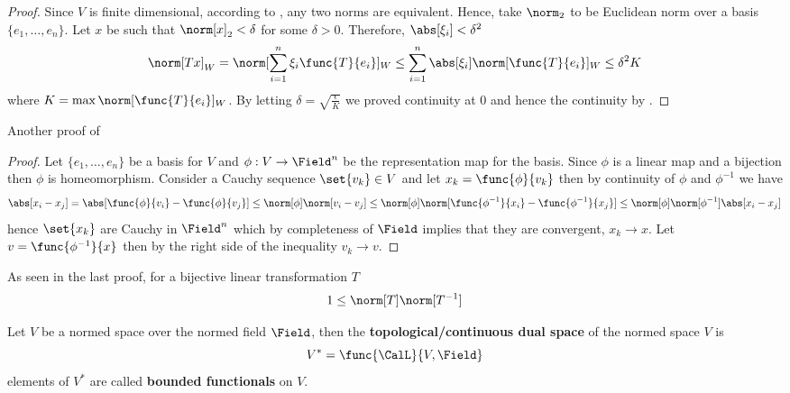 \begin{proof}
    Since \(V\) is finite dimensional, according to , any two norms are equivalent. Hence, take \(\norm_2\) to be Euclidean norm over a basis \(\{e_1, \dots , e_n\}\). Let \(x\) be such that \(\norm[x]_2 < \delta\) for some \(\delta > 0\). Therefore, \(\abs[\xi_i] < \delta^2\)
    \begin{equation*}
        \norm[Tx]_W = \norm[\sum_{i = 1}^n \xi_i \func{T}{e_i}]_W \leq \sum_{i = 1}^n \abs[\xi_i] \norm[\func{T}{e_i}]_W \leq \delta^2 K
    \end{equation*}
    where \(K = \max \norm[\func{T}{e_i}]_W \). By letting \(\delta = \sqrt{\frac{\epsilon}{K}}\) we proved continuity at \(0\) and hence the continuity by .
\end{proof}

Another proof of 

\begin{proof}
    Let \(\{e_1, \dots , e_n\}\) be a basis for \(V\) and \(\phi : V \to \Field^n\) be the representation map for the basis. Since \(\phi\) is a linear map and a bijection then \(\phi\) is homeomorphism. Consider a Cauchy sequence \(\set{v_k} \in V\) and let \(x_k = \func{\phi}{v_k}\) then by continuity of \(\phi\) and \(\phi^{-1}\) we have
    \begin{equation*}
        \abs[x_i - x_j] = \abs[\func{\phi}{v_i} - \func{\phi}{v_j}] \leq \norm[\phi] \norm[v_i - v_j] \leq \norm[\phi] \norm[\func{\phi^{-1}}{x_i} - \func{\phi^{-1}}{x_j}] \leq \norm[\phi] \norm[\phi^{-1}] \abs[x_i - x_j]
    \end{equation*}
    hence \(\set{x_k}\) are Cauchy in \(\Field^n\) which by completeness of \(\Field\) implies that they are convergent, \(x_k \to x\). Let \(v = \func{\phi^{-1}}{x}\) then by the right side of the inequality \(v_k \to v\).
\end{proof}

\begin{remark}
    As seen in the last proof, for a bijective linear transformation \(T\)
    \begin{equation*}
        1 \leq \norm[T] \norm[T^{-1}]
    \end{equation*}
\end{remark}

\begin{definition}
    Let \(V\) be a normed space over the normed field \(\Field\), then the \textbf{topological/continuous dual space} of the normed space \(V\) is
    \begin{equation*}
        V^\ast  = \func{\CalL}{V,\Field}
    \end{equation*}
    elements of \(V^\ast\) are called \textbf{bounded functionals} on \(V\).
\end{definition}

